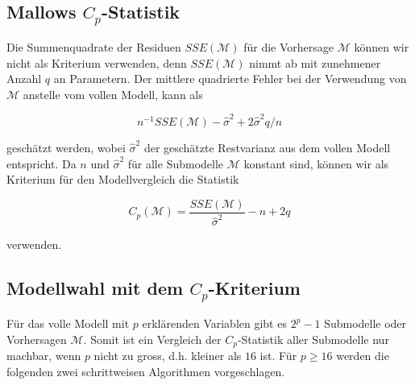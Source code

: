 \documentclass[]{book}
\begin{document}
\subsection{\texorpdfstring{Mallows
\(C_p\)-Statistik}{Mallows C\_p-Statistik}}\label{mallows-c_p-statistik}

Die Summenquadrate der Residuen \(SSE(\mathcal{M})\) für die Vorhersage
\(\mathcal{M}\) können wir nicht als Kriterium verwenden, denn
\(SSE(\mathcal{M})\) nimmt ab mit zunehmener Anzahl \(q\) an Parametern.
Der mittlere quadrierte Fehler bei der Verwendung von \(\mathcal{M}\)
anstelle vom vollen Modell, kann als

\begin{equation}n^{-1} SSE(\mathcal{M}) - \hat{\sigma}^2 + 2\hat{\sigma}^2q/n\end{equation}

geschätzt werden, wobei \(\hat{\sigma}^2\) der geschätzte Restvarianz
aus dem vollen Modell entspricht. Da \(n\) und \(\hat{\sigma}^2\) für
alle Submodelle \(\mathcal{M}\) konstant sind, können wir als Kriterium
für den Modellvergleich die Statistik

\begin{equation}C_p(\mathcal{M}) = \frac{SSE(\mathcal{M})}{\hat{\sigma}^2} - n + 2q\end{equation}

verwenden.

\subsection{\texorpdfstring{Modellwahl mit dem
\(C_p\)-Kriterium}{Modellwahl mit dem C\_p-Kriterium}}\label{modellwahl-mit-dem-c_p-kriterium}

Für das volle Modell mit \(p\) erklärenden Variablen gibt es \(2^p-1\)
Submodelle oder Vorhersagen \(\mathcal{M}\). Somit ist ein Vergleich der
\(C_p\)-Statistik aller Submodelle nur machbar, wenn \(p\) nicht zu
gross, d.h. kleiner als \(16\) ist. Für \(p \ge 16\) werden die
folgenden zwei schrittweisen Algorithmen vorgeschlagen.
\end{document}
